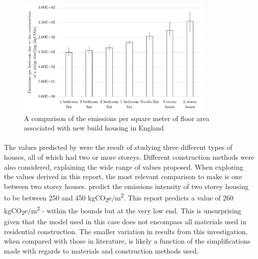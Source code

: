 \documentclass[12pt]{article}
\begin{document}
\begin{figure}[!ht]
    \centering
    \includegraphics[width=0.85\textwidth]{Figures/Per_m2.png}
    \caption{A comparison of the emissions per square meter of floor area associated with new build housing in England}
    \label{fig:bym2}
\end{figure}

\paragraph{}
The values predicted by \citet{Suzuki1995-ve} were the result of studying three different types of houses, all of which had two or more storeys. Different construction methods were also considered, explaining the wide range of values proposed. When exploring the values derived in this report, the most relevant comparison to make is one between two storey houses. \citet{Suzuki1995-ve} predict the emissions intensity of two storey housing to be between 250 and 450 kgCO\textsubscript{2}e/m\textsuperscript{2}. This report predicts a value of 260 kgCO\textsubscript{2}e/m\textsuperscript{2} - within the bounds but at the very low end. This is unsurprising given that the model used in this case does not encompass all materials used in residential construction. The smaller variation in results from this investigation, when compared with those in literature, is likely a function of the simplifications made with regards to materials and construction methods used.
\end{document}
